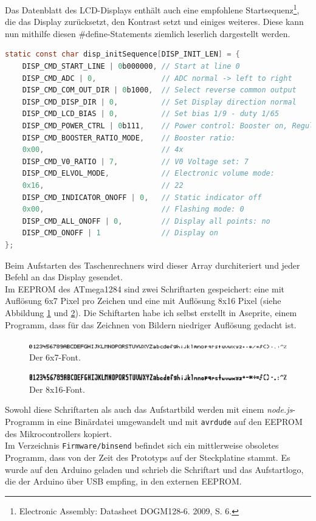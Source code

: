 \documentclass[12pt, a4paper]{report}
\begin{document}
Das Datenblatt des LCD-Displays enthält auch eine empfohlene Startsequenz\footnote{Electronic Assembly: Datasheet DOGM128-6. 2009, S. 6.}, die das Display zurücksetzt, den Kontrast setzt und einiges weiteres. Diese kann nun mithilfe diesen \textsf{\#define}-Statements ziemlich leserlich dargestellt werden.
\newpage
\begin{lstlisting}[language=C]
static const char disp_initSequence[DISP_INIT_LEN] = {
    DISP_CMD_START_LINE | 0b000000, // Start at line 0
    DISP_CMD_ADC | 0,               // ADC normal -> left to right
    DISP_CMD_COM_OUT_DIR | 0b1000,  // Select reverse common output
    DISP_CMD_DISP_DIR | 0,          // Set Display direction normal
    DISP_CMD_LCD_BIAS | 0,          // Set bias 1/9 - duty 1/65
    DISP_CMD_POWER_CTRL | 0b111,    // Power control: Booster on, Regulator on, Follower on
    DISP_CMD_BOOSTER_RATIO_MODE,    // Booster ratio:
    0x00,                           // 4x
    DISP_CMD_V0_RATIO | 7,          // V0 Voltage set: 7
    DISP_CMD_ELVOL_MODE,            // Electronic volume mode:
    0x16,                           // 22
    DISP_CMD_INDICATOR_ONOFF | 0,   // Static indicator off
    0x00,                           // Flashing mode: 0
    DISP_CMD_ALL_ONOFF | 0,         // Display all points: no
    DISP_CMD_ONOFF | 1              // Display on
};
\end{lstlisting}
Beim Aufstarten des Taschenrechners wird dieser Array durchiteriert und jeder Befehl an das Display gesendet.
\\[\medskipamount]
Im EEPROM des ATmega1284 sind zwei Schriftarten gespeichert: eine mit Auflösung 6x7 Pixel pro Zeichen und eine mit Auflösung 8x16 Pixel (siehe Abbildung \ref{fig:fontsmall} und \ref{fig:fontmedium}). Die Schiftarten habe ich selbst erstellt in Aseprite, einem Programm, dass für das Zeichnen von Bildern niedriger Auflösung gedacht ist.
\begin{figure}[H]
	\includegraphics[width=\linewidth]{assets/font6x7l.png}
	\caption{Der 6x7-Font.}
	\label{fig:fontsmall}
\end{figure}
\begin{figure}[H]
	\includegraphics[width=\linewidth]{assets/font8x16l.png}
	\caption{Der 8x16-Font.}
	\label{fig:fontmedium}
\end{figure}
Sowohl diese Schriftarten als auch das Aufstartbild werden mit einem \textit{node.js}-Programm in eine Binärdatei umgewandelt und mit \texttt{avrdude} auf den EEPROM des Mikrocontrollers kopiert.
\\[\medskipamount]
Im Verzeichnis \texttt{Firmware/binsend} befindet sich ein mittlerweise obsoletes Programm, dass von der Zeit des Prototyps auf der Steckplatine stammt. Es wurde auf den Arduino geladen und schrieb die Schriftart und das Aufstartlogo, die der Arduino über USB empfing, in den externen EEPROM.
\end{document}
